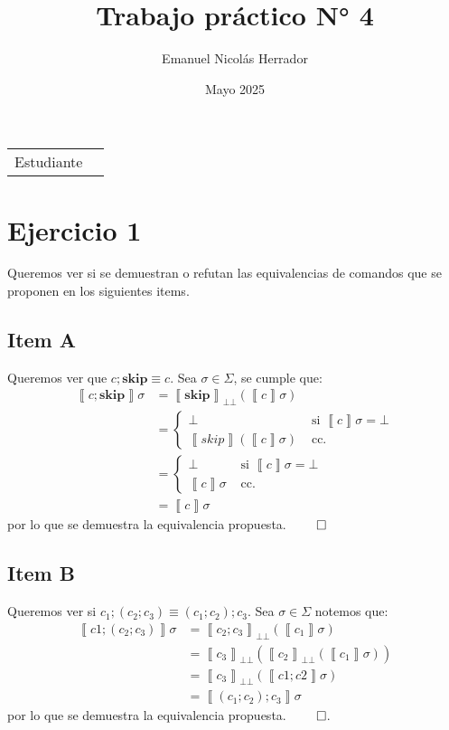 \documentclass{article}
\title{Trabajo práctico N° 4}
\author{Emanuel Nicolás Herrador}
\date{Mayo 2025}
\newcommand{\sem}[1]{\left\llbracket #1\right\rrbracket}
\newcommand{\bbot}{\bot\!\!\!\bot}
\newcommand{\cskip}{\textbf{skip}}
\begin{document}
\maketitle

\noindent\begin{tabular}{@{}ll}
	Estudiante & \theauthor \\
\end{tabular}

\section*{Ejercicio 1}
Queremos ver si se demuestran o refutan las equivalencias de comandos que se proponen en los siguientes items.

\subsection*{Item A}
Queremos ver que $c; \cskip \equiv c$.
Sea $\sigma \in \Sigma$, se cumple que:
\begin{equation*}
  \begin{aligned}
    \sem{c; \cskip}\sigma &= \sem{\cskip}_{\bbot}(\sem{c}\sigma) \\ 
                          &= \begin{cases}
                            \bot &\text{ si }\sem{c}\sigma = \bot \\ 
                            \sem{skip}(\sem{c}\sigma) &\text{ cc. }
                          \end{cases} \\ 
                          &= \begin{cases}
                            \bot &\text{ si }\sem{c}\sigma = \bot \\ 
                            \sem{c}\sigma &\text{ cc. }
                          \end{cases} \\ 
                          &= \sem{c}\sigma 
  \end{aligned}
\end{equation*}
por lo que se demuestra la equivalencia propuesta. $\qed$

\subsection*{Item B}
Queremos ver si $c_1; (c_2; c_3) \equiv (c_1; c_2); c_3$.
Sea $\sigma \in \Sigma$ notemos que:
\begin{equation*}
  \begin{aligned}
    \sem{c1; (c_2; c_3)}\sigma &= \sem{c_2; c_3}_{\bbot}(\sem{c_1}\sigma) \\ 
                               &= \sem{c_3}_{\bbot}(\sem{c_2}_{\bbot}(\sem{c_1}\sigma)) \\ 
                               &= \sem{c_3}_{\bbot}(\sem{c1; c2}\sigma) \\ 
                               &= \sem{(c_1; c_2); c_3}\sigma
  \end{aligned}
\end{equation*}
por lo que se demuestra la equivalencia propuesta. $\qed$.
\end{document}
